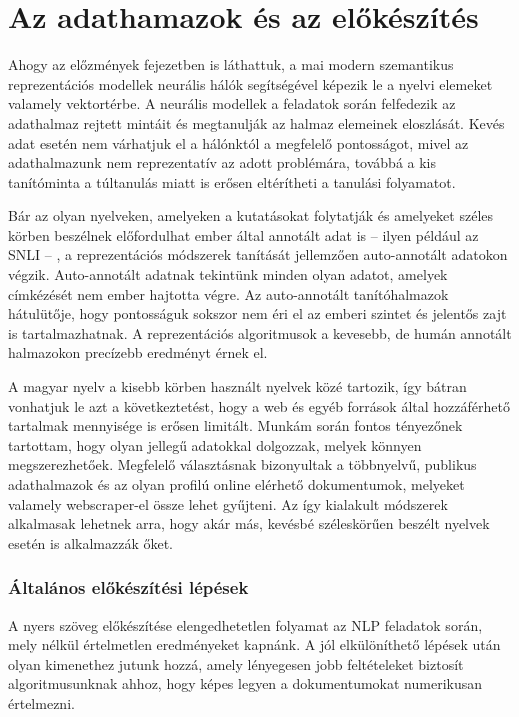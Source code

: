\chapter{Az adathamazok és az előkészítés}
\label{ch:datasets}

Ahogy az előzmények fejezetben is láthattuk, a mai modern szemantikus reprezentációs modellek neurális hálók segítségével képezik le a nyelvi elemeket valamely vektortérbe. A neurális modellek a feladatok során felfedezik az adathalmaz rejtett mintáit és megtanulják az halmaz elemeinek eloszlását. Kevés adat esetén nem várhatjuk el a hálónktól a megfelelő pontosságot, mivel az adathalmazunk nem reprezentatív az adott problémára, továbbá a kis tanítóminta a túltanulás miatt is erősen eltérítheti a tanulási folyamatot.

Bár az olyan nyelveken, amelyeken a kutatásokat folytatják és amelyeket széles körben beszélnek előfordulhat ember által annotált adat is – ilyen például az SNLI – , a reprezentációs módszerek tanítását jellemzően auto-annotált adatokon végzik. Auto-annotált adatnak tekintünk minden olyan adatot, amelyek címkézését nem ember hajtotta végre. Az auto-annotált tanítóhalmazok hátulütője, hogy pontosságuk sokszor nem éri el az emberi szintet és jelentős zajt is tartalmazhatnak. A reprezentációs algoritmusok a kevesebb, de humán annotált halmazokon precízebb eredményt érnek el.

A magyar nyelv a kisebb körben használt nyelvek közé tartozik, így bátran vonhatjuk le azt a következtetést, hogy a web és egyéb források által hozzáférhető tartalmak mennyisége is erősen limitált. 
Munkám során fontos tényezőnek tartottam, hogy olyan jellegű adatokkal dolgozzak, melyek könnyen megszerezhetőek. Megfelelő választásnak bizonyultak a többnyelvű, publikus adathalmazok és az olyan profilú online elérhető dokumentumok, melyeket valamely webscraper-el össze lehet gyűjteni. Az így kialakult módszerek alkalmasak lehetnek arra, hogy akár más, kevésbé széleskörűen beszélt nyelvek esetén is alkalmazzák őket.

\subsection{Általános előkészítési lépések}

A nyers szöveg előkészítése elengedhetetlen folyamat az NLP feladatok során, mely nélkül értelmetlen eredményeket kapnánk. A jól elkülöníthető lépések után olyan kimenethez jutunk hozzá, amely lényegesen jobb feltételeket biztosít algoritmusunknak ahhoz, hogy képes legyen a dokumentumokat numerikusan értelmezni.

